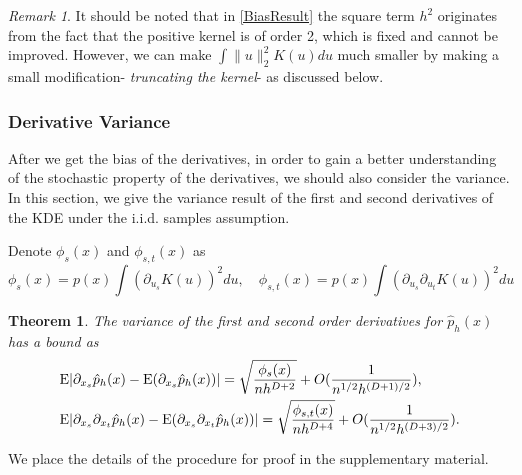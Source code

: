 \documentclass[aos,preprint]{imsart}
\newtheorem{theorem}{Theorem}[section]
\theoremstyle{remark}
\newtheorem*{remark}{Remark}
\begin{document}

\begin{remark}
It should be noted that in \eqref{BiasResult} the square term $h^2$ originates from the fact that the positive kernel is of order 2, which is fixed and cannot be improved. However, we can make $\int \|u\|_2^2 K(u)du$ much smaller by making a small modification- {\it truncating the kernel}- as discussed below.
\end{remark}
\subsubsection{Derivative Variance}
After we get the bias of the derivatives, in order to gain a better understanding of the stochastic property of the derivatives, we should also consider the variance. In this section, we give the variance result of the first and second derivatives of the KDE under the i.i.d. samples assumption. 

Denote $\phi_s(x)$ and $\phi_{s,t}(x)$ as
\[
\phi_s(x) = p(x) \int (\partial_{ u_s } K (u) )^2 du,\quad  \phi_{s,t}(x) = p(x) \int (\partial_{u_s}\partial_{u_t} K (u) )^2 du
\]
\begin{theorem}
The variance of the first and second order derivatives for $\hat{p}_h(x)$ has a bound as 
\begin{equation*}\label{VarResult}
\begin{aligned}
&{\rm E} |\partial_{x_s} \hat{p}_h(x)-{\rm E}(\partial_{x_s} \hat{p}_h(x))| = \sqrt{\frac{\phi_s(x)}{n h^{D+2}}}+O(\frac{1}{n^{1/2}h^{(D+1)/2}}),\\
&{\rm E} | \partial_{x_s}\partial_{x_t} \hat{p}_h(x) -{\rm E}(\partial_{x_s}\partial_{x_t} \hat{p}_h(x))| = \sqrt{\frac{\phi_{s,t}(x)}{nh^{D+4}}}+O(\frac{1}{n^{1/2}h^{(D+3)/2}}).
\end{aligned}
\end{equation*}
\end{theorem}
We place the details of the procedure for proof in the supplementary material. %
\end{document}
